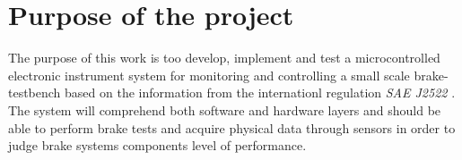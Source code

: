 	\section{Purpose of the project}\label{sec:purpose}
		The purpose of this work is too develop, implement and test a microcontrolled electronic instrument system for monitoring and controlling a small scale brake-testbench based on the information from the internationl regulation \textit{SAE J2522} \cite{sae}. The system will comprehend both software and hardware layers and should be able to perform brake tests and acquire physical data through sensors in order to judge brake systems components level of performance.
		

